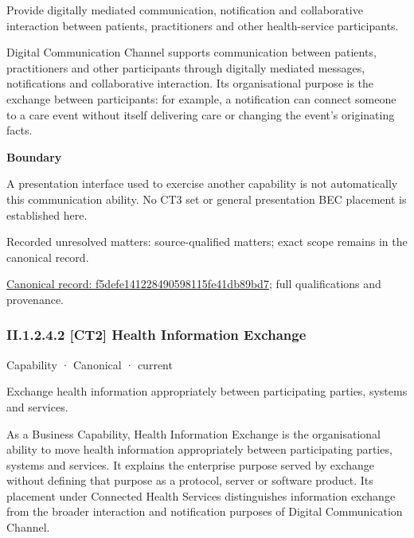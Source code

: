 Provide digitally mediated communication, notification and collaborative interaction between patients, practitioners and other health-service participants.



Digital Communication Channel supports communication between patients, practitioners and other participants through digitally mediated messages, notifications and collaborative interaction. Its organisational purpose is the exchange between participants: for example, a notification can connect someone to a care event without itself delivering care or changing the event's originating facts.



\textbf{Boundary}



A presentation interface used to exercise another capability is not automatically this communication ability. No CT3 set or general presentation BEC placement is established here.


{\small Recorded unresolved matters: source-qualified matters; exact scope remains in the canonical record.}\par
{\footnotesize \href{../../../../../../../continuum/strategy/capability/f5defe141228490598115fe41db89bd7.md}{Canonical record: f5defe141228490598115fe41db89bd7}; full qualifications and provenance.}\par
\subsubsection*{II.1.2.4.2 [CT2] Health Information Exchange}
\label{navigation:II.1.2.4.2}

\label{element:baad6b6117084311acbf5fc4044dfabf}
{\small Capability · Canonical · current}\par

Exchange health information appropriately between participating parties, systems and services.



As a Business Capability, Health Information Exchange is the organisational ability to move health information appropriately between participating parties, systems and services. It explains the enterprise purpose served by exchange without defining that purpose as a protocol, server or software product. Its placement under Connected Health Services distinguishes information exchange from the broader interaction and notification purposes of Digital Communication Channel.



